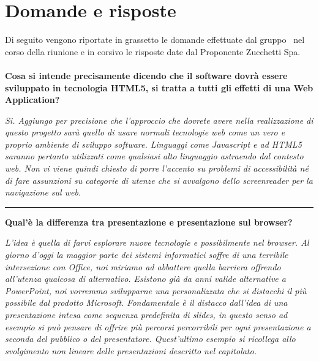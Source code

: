 \newenvironment{margini}[2]
{
	\begin{list}{} {
			\setlength{\leftmargin}{#1}
			\setlength{\rightmargin}{#2}
		} \item }
	{\end{list}}

\section{Domande e risposte}
Di seguito vengono riportate in grassetto le domande effettuate dal gruppo \gruppo\ nel corso della riunione e in corsivo le risposte date dal Proponente Zucchetti Spa.\\
\\\textbf{Cosa si intende precisamente dicendo che il software dovrà essere sviluppato in tecnologia HTML5, si tratta a tutti gli effetti di una Web Application?}\\
\begin{margini}{0.7cm}{0.7cm}
\textit{Si.  Aggiungo per  precisione che l'approccio che dovrete avere nella realizzazione di questo progetto sarà quello di usare normali tecnologie web come un vero e proprio ambiente di sviluppo software. Linguaggi come Javascript e ad HTML5 saranno pertanto utilizzati come qualsiasi alto linguaggio astraendo dal contesto web. Non vi viene quindi chiesto di porre l'accento su problemi di accessibilità né di fare assunzioni su categorie di utenze che si avvalgono dello screenreader per la navigazione sul web.}\\
\end{margini}
\hrule
\bigskip
\textbf{Qual'è la differenza tra presentazione e presentazione sul browser?}\\
\begin{margini}{0.7cm}{0.7cm}
	\textit{L'idea è quella di farvi esplorare nuove tecnologie e possibilmente nel browser. Al giorno d'oggi la maggior parte dei sistemi informatici soffre di una terribile intersezione con Office, noi miriamo ad abbattere quella barriera offrendo all'utenza qualcosa di alternativo. Esistono già da anni valide alternative a PowerPoint, noi vorremmo svilupparne una personalizzata che si distacchi il più possibile dal prodotto Microsoft. Fondamentale è il distacco dall'idea di una presentazione intesa come sequenza predefinita di slides, in questo senso ad esempio si può pensare di offrire più percorsi percorribili per ogni presentazione a seconda del pubblico o del presentatore. Quest'ultimo esempio si ricollega allo svolgimento non lineare delle presentazioni descritto nel capitolato.}\\
\end{margini}
